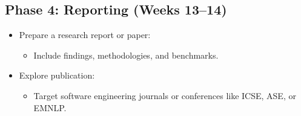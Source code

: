 \documentclass[12pt]{article}
\begin{document}
\subsection*{Phase 4: Reporting (Weeks 13--14)}
\begin{itemize}
    \item Prepare a research report or paper:
    \begin{itemize}
        \item Include findings, methodologies, and benchmarks.
    \end{itemize}
    \item Explore publication:
    \begin{itemize}
        \item Target software engineering journals or conferences like ICSE, ASE, or EMNLP.
    \end{itemize}
\end{itemize}
\end{document}

